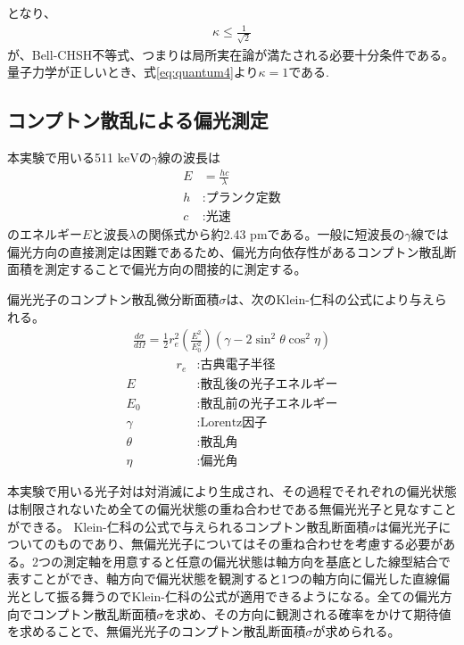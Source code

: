 \documentclass[../../main.tex]{subfiles}
\numberwithin{equation}{section}
\numberwithin{table}{section}
\numberwithin{figure}{section}
\begin{document}
となり、
\begin{align}
  \kappa \leq \textstyle\frac{1}{\sqrt{2}} 
\end{align}
が、Bell-CHSH不等式、つまりは局所実在論が満たされる必要十分条件である。量子力学が正しいとき、式\eqref{eq:quantum4}より$\kappa=1$である.



\newpage
\subsection{コンプトン散乱による偏光測定}\label{subsec:comptom}
本実験で用いる511 $\si{\kilo\electronvolt}$の$\gamma$線の波長は
\begin{align} 
	E &= \frac{hc}{\lambda}\\
	h &: \text{プランク定数}\nonumber\\
	c &: \text{光速}\nonumber 
\end{align}
のエネルギー$E$と波長$\lambda$の関係式から約2.43 $\si{\pico\meter}$である。一般に短波長の$\gamma$線では偏光方向の直接測定は困難であるため、偏光方向依存性があるコンプトン散乱断面積を測定することで偏光方向の間接的に測定する。

偏光光子のコンプトン散乱微分断面積$\sigma$は、次のKlein-仁科の公式により与えられる。
\begin{align}
	\frac{d \sigma} {d \Omega} = \frac 12 r_e^2 \left( \frac{E^2} {E_0^2} \right) (\gamma - 2\sin^2 \theta \cos^2 \eta)
\label{klein-nishina}
\end{align}
\begin{align}
  \hspace{4em}r_e&: \text{古典電子半径}\nonumber \\
               E &: \text{散乱後の光子エネルギー}\nonumber \\
              E_0&: \text{散乱前の光子エネルギー}\nonumber \\
  				 \gamma&: \text{Lorentz因子}\nonumber \\
  				 \theta&: \text{散乱角}\nonumber \\
  					 \eta&: \text{偏光角}\nonumber
\end{align}


本実験で用いる光子対は対消滅により生成され、その過程でそれぞれの偏光状態は制限されないため全ての偏光状態の重ね合わせである無偏光光子と見なすことができる。
Klein-仁科の公式で与えられるコンプトン散乱断面積$\sigma$は偏光光子についてのものであり、無偏光光子についてはその重ね合わせを考慮する必要がある。2つの測定軸を用意すると任意の偏光状態は軸方向を基底とした線型結合で表すことができ、軸方向で偏光状態を観測すると1つの軸方向に偏光した直線偏光として振る舞うのでKlein-仁科の公式が適用できるようになる。全ての偏光方向でコンプトン散乱断面積$\sigma$を求め、その方向に観測される確率をかけて期待値を求めることで、無偏光光子のコンプトン散乱断面積$\sigma$が求められる。
\end{document}
